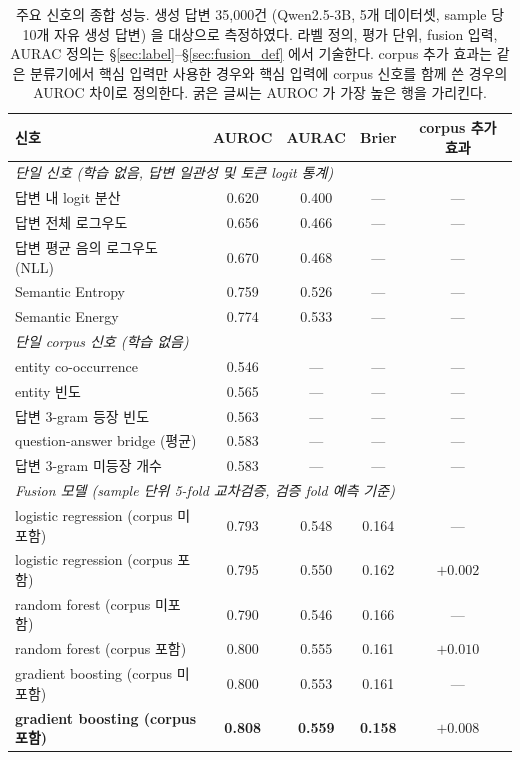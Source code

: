 \begin{table}[htbp]
\centering
\small
\caption[주요 신호의 종합 성능]{주요 신호의 종합 성능. 생성 답변 35{,}000건 (Qwen2.5-3B, 5개 데이터셋, sample 당 10개 자유 생성 답변) 을 대상으로 측정하였다. 라벨 정의, 평가 단위, fusion 입력, AURAC 정의는 §\ref{sec:label}--§\ref{sec:fusion_def} 에서 기술한다. corpus 추가 효과는 같은 분류기에서 핵심 입력만 사용한 경우와 핵심 입력에 corpus 신호를 함께 쓴 경우의 AUROC 차이로 정의한다. 굵은 글씨는 AUROC 가 가장 높은 행을 가리킨다.}
\label{tab:current_thesis_evidence}
\begin{tabular}{@{}lcccc@{}}
\toprule
신호 & AUROC & AURAC & Brier & corpus 추가 효과 \\
\midrule
\multicolumn{5}{l}{\emph{단일 신호 (학습 없음, 답변 일관성 및 토큰 logit 통계)}} \\
\quad 답변 내 logit 분산                & 0.620 & 0.400 & --- & --- \\
\quad 답변 전체 로그우도               & 0.656 & 0.466 & --- & --- \\
\quad 답변 평균 음의 로그우도 (NLL)    & 0.670 & 0.468 & --- & --- \\
\quad Semantic Entropy            & 0.759 & 0.526 & --- & --- \\
\quad Semantic Energy                  & 0.774 & 0.533 & --- & --- \\
\midrule
\multicolumn{5}{l}{\emph{단일 corpus 신호 (학습 없음)}} \\
\quad entity co-occurrence              & 0.546 & --- & --- & --- \\
\quad entity 빈도                      & 0.565 & --- & --- & --- \\
\quad 답변 3-gram 등장 빈도            & 0.563 & --- & --- & --- \\
\quad question-answer bridge (평균)    & 0.583 & --- & --- & --- \\
\quad 답변 3-gram 미등장 개수          & 0.583 & --- & --- & --- \\
\midrule
\multicolumn{5}{l}{\emph{Fusion 모델 (sample 단위 5-fold 교차검증, 검증 fold 예측 기준)}} \\
\quad logistic regression (corpus 미포함)    & 0.793 & 0.548 & 0.164 & --- \\
\quad logistic regression (corpus 포함)      & 0.795 & 0.550 & 0.162 & $+0.002$ \\
\quad random forest (corpus 미포함)          & 0.790 & 0.546 & 0.166 & --- \\
\quad random forest (corpus 포함)            & 0.800 & 0.555 & 0.161 & $+0.010$ \\
\quad gradient boosting (corpus 미포함)      & 0.800 & 0.553 & 0.161 & --- \\
\quad \textbf{gradient boosting (corpus 포함)} & \textbf{0.808} & \textbf{0.559} & \textbf{0.158} & $+0.008$ \\
\bottomrule
\end{tabular}
\end{table}
